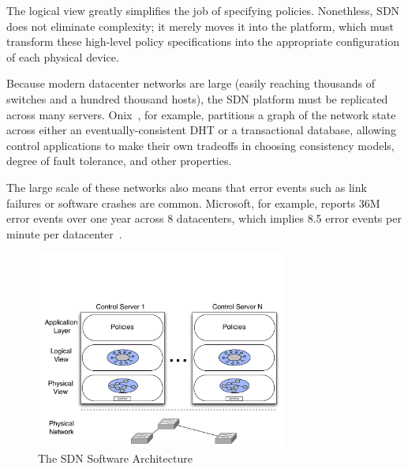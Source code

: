 
The logical view greatly simplifies the job of specifying policies.
Nonethless, SDN
does not eliminate complexity; it merely moves it into the platform, which
must transform these high-level policy specifications into the appropriate
configuration of each physical device.

Because modern datacenter networks are
large (easily reaching thousands of switches and a hundred thousand hosts),
the SDN platform must be replicated across many servers.
Onix~\cite{onix}, for example,
partitions a graph of the network state across either an eventually-consistent
DHT or a transactional database, allowing control applications to make their own
tradeoffs in choosing consistency models, degree of
fault tolerance, and other properties.

The large scale of these networks also means that error events such as link
failures or software crashes are common.
Microsoft, for example, reports 36M 
error events over one year across 8 datacenters,
which implies 8.5 error events per minute per
datacenter~\cite{Greenberg:2009:VSF:1592568.1592576}.

\begin{figure}[t]
    \includegraphics[width=3.25in]{../diagrams/architecture/SDN_Stack.pdf}
    \caption[]{\label{fig:basicarch} The SDN Software Architecture } 
\end{figure}

